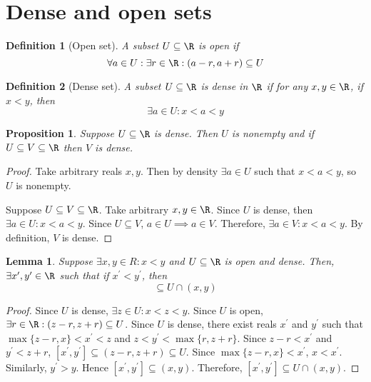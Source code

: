 \documentclass[letterpaper,11pt]{article}
\newtheorem{prop}{Proposition}
\newtheorem{lem}{Lemma}
\newtheorem{defn}{Definition}
\newcommand{\intersn}{\cap}
\begin{document}
\section{Dense and open sets}

\begin{defn}[Open set]
  A subset $U \subseteq \R$ is \emph{open} if
  \begin{equation*}
    \forall a \in U: \exists r \in \R: (a - r, a + r) \subseteq U
  \end{equation*}
\end{defn}

\begin{defn}[Dense set]
  A subset $U \subseteq \R$ is \emph{dense} in $\R$ if for any $x, y \in \R$,
  if $x < y$, then
  \begin{equation*}
    \exists a \in U: x < a < y
  \end{equation*}
\end{defn}

\begin{prop}
  Suppose $U \subseteq \R$ is dense.
  Then $U$ is nonempty and if $U \subseteq V \subseteq \R$ then $V$ is dense.
\end{prop}

\begin{proof}
  Take arbitrary reals $x, y$. Then by density $\exists a \in U$ such that
  $x < a < y$, so $U$ is nonempty.

  Suppose $U \subseteq V \subseteq \R$.
  Take arbitrary $x, y \in \R$.
  Since $U$ is dense, then $\exists a \in U: x < a < y$.
  Since $U \subseteq V$, $a \in U \implies a \in V$.
  Therefore, $\exists a \in V: x < a < y$.
  By definition, $V$ is dense.
\end{proof}

\begin{lem}
  Suppose $\exists x, y \in R: x < y$ and $U \subseteq \R$ is open and dense.
  Then, $\exists x^\prime, y^\prime \in \R$ such that if $x^\prime < y^\prime$,
  then
  \begin{equation*}
    [x^\prime, y^\prime] \subseteq U \intersn (x, y)
  \end{equation*}
  \label{lem:open-dense-interval}
\end{lem}

\begin{proof}
  Since $U$ is dense, $\exists z \in U: x < z < y$.
  Since $U$ is open, $\exists r \in \R: (z-r, z+r) \subseteq U$.
  Since $U$ is dense, there exist reals $x^\prime$ and $y^\prime$
  such that $\max \{z-r, x\} < x^\prime < z$
  and $z < y^\prime < \max \{r, z+r\}$.
  Since $z - r < x^\prime$ and $y^\prime < z + r$,
  $[x^\prime, y^\prime] \subseteq (z - r, z + r) \subseteq U$.
  Since $\max \{z - r, x\} < x^\prime$, $x < x^\prime$.
  Similarly, $y^\prime > y$. Hence $[x^\prime, y^\prime] \subseteq (x, y)$.
  Therefore, $[x^\prime, y^\prime] \subseteq U \intersn (x, y)$.
\end{proof}
\end{document}
